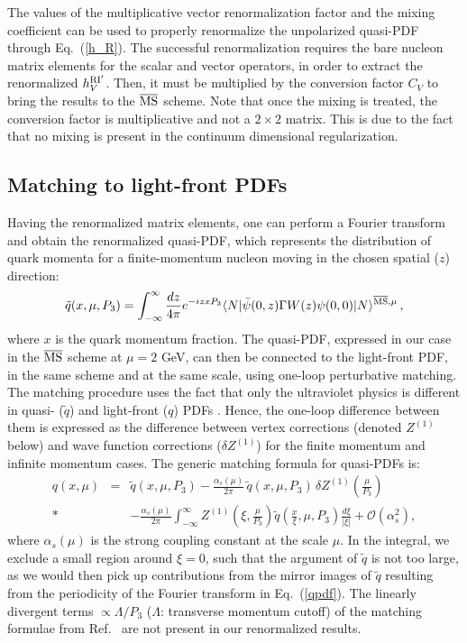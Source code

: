 \documentclass[12pt,tighten,nofootinbib,amssymb,floatfix]{article}
\newcommand{\MSb}{{\overline{\rm MS}}}
\begin{document}
\vspace*{0.5cm}
The values of the multiplicative vector renormalization factor and the mixing coefficient can be used to properly 
renormalize the unpolarized quasi-PDF through Eq.~(\ref{h_R}). The successful renormalization requires the bare 
nucleon matrix elements for the scalar and vector operators, in order to extract the renormalized $h_V^{\rm RI'}$.
Then, it must be multiplied by the conversion factor $C_V$ to bring the results to the $\MSb$ scheme. 
Note that once the mixing is treated, the conversion factor is multiplicative and not a $2{\times}2$ matrix. 
This is due to the fact that no mixing is present in the continuum dimensional regularization. 


\subsection{Matching to light-front PDFs}
Having the renormalized matrix elements, one can perform a Fourier transform and obtain the renormalized quasi-PDF, 
which represents the distribution of quark momenta for a finite-momentum nucleon moving in the chosen spatial ($z$) direction:
\begin{equation}
\label{qpdf}
\tilde{q}(x,\mu,P_3) = \int_{-\infty}^\infty \frac{dz}{4\pi} e^{-i z x P_3} \langle N |
\bar{\psi}(0,z)\Gamma W(z) \psi(0,0) |N\rangle^{\MSb,\mu}\,,
\end{equation}
where $x$ is the quark momentum fraction.
The quasi-PDF, expressed in our case in the $\MSb$ scheme at $\mu{=}2$ GeV, can then be connected to the light-front PDF, in the same scheme and at the same scale, using one-loop perturbative matching.
The matching procedure uses the fact that only the ultraviolet physics is different in quasi- ($\tilde{q}$) and light-front ($q$) PDFs \cite{Xiong:2013bka}.
Hence, the one-loop difference between them is expressed as the difference between vertex corrections (denoted $Z^{(1)}$ below) and wave function corrections ($\delta Z^{(1)}$) for the finite momentum and infinite momentum cases.
The generic matching formula for quasi-PDFs is: \cite{Ji:2015jwa,Chen:2016fxx}
\begin{eqnarray}
\label{invq}
q\left(x,\mu\right) &=& \tilde{q}(x,\mu,P_3) - \frac{\alpha_s(\mu)}{2\pi} \,\tilde{q}(x,\mu,P_3)\,\delta Z^{(1)}\!\left( \frac{\mu}{P_3}\right)  \nonumber\\*
& & - \frac{\alpha_s(\mu)}{2\pi} \int_{-\infty}^{\infty} Z^{(1)}\!\left( \xi, \frac{\mu}{P_3} \right) \tilde{q}\! \left( \frac{x}{\xi},\mu,P_3 \right) \frac{d\xi}{|\xi |} + \mathcal{O}(\alpha_s^2),
\end{eqnarray}
where $\alpha_s(\mu)$ is the strong coupling constant at the scale $\mu$.
In the integral, we exclude a small region around $\xi=0$, such that the argument of $\tilde{q}$ is not too large, as we would then pick up contributions from the mirror images of $\tilde{q}$ resulting from the periodicity of the Fourier transform in Eq.~(\ref{qpdf}).
The linearly divergent terms $\propto\Lambda/P_3$ ($\Lambda$: transverse momentum cutoff) of the matching 
formulae from Ref.~\cite{Xiong:2013bka} are not present in our renormalized results.
\end{document}
